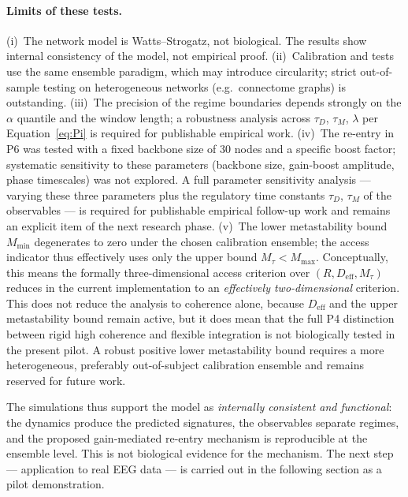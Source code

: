 ﻿\documentclass[11pt,a4paper]{article}
\theoremstyle{plain}
\theoremstyle{definition}
\theoremstyle{remark}
\begin{document}
\paragraph{Limits of these tests.} (i)~The network model is Watts--Strogatz, not biological. The results show internal consistency of the model, not empirical proof. (ii)~Calibration and tests use the same ensemble paradigm, which may introduce circularity; strict out-of-sample testing on heterogeneous networks (e.g.\ connectome graphs) is outstanding. (iii)~The precision of the regime boundaries depends strongly on the $\alpha$ quantile and the window length; a robustness analysis across $\tau_D$, $\tau_M$, $\lambda$ per Equation~\eqref{eq:Pi} is required for publishable empirical work. (iv)~The re-entry in P6 was tested with a fixed backbone size of 30 nodes and a specific boost factor; systematic sensitivity to these parameters (backbone size, gain-boost amplitude, phase timescales) was not explored. A full parameter sensitivity analysis --- varying these three parameters plus the regulatory time constants $\tau_D$, $\tau_M$ of the observables --- is required for publishable empirical follow-up work and remains an explicit item of the next research phase. (v)~The lower metastability bound $M_{\min}$ degenerates to zero under the chosen calibration ensemble; the access indicator thus effectively uses only the upper bound $M_\tau < M_{\max}$. Conceptually, this means the formally three-dimensional access criterion over $(R, D_{\mathrm{eff}}, M_\tau)$ reduces in the current implementation to an \emph{effectively two-dimensional} criterion. This does not reduce the analysis to coherence alone, because $D_{\mathrm{eff}}$ and the upper metastability bound remain active, but it does mean that the full P4 distinction between rigid high coherence and flexible integration is not biologically tested in the present pilot. A robust positive lower metastability bound requires a more heterogeneous, preferably out-of-subject calibration ensemble and remains reserved for future work.

The simulations thus support the model as \emph{internally consistent and functional}: the dynamics produce the predicted signatures, the observables separate regimes, and the proposed gain-mediated re-entry mechanism is reproducible at the ensemble level. This is not biological evidence for the mechanism. The next step --- application to real EEG data --- is carried out in the following section as a pilot demonstration.


\end{document}
